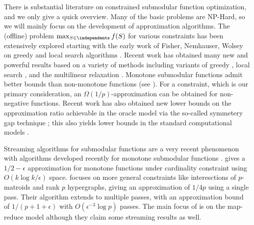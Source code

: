 \documentclass[oneside,letterpaper]{scrartcl} \usepackage{macros}
\newcommand{\eps}{\epsilon}
\begin{document}
There is substantial literature on constrained submodular function
optimization, and we only give a quick overview.  Many of the basic
problems are NP-Hard, so we will mainly focus on the development of
approximation algorithms.  The (offline) problem $\max_{S \in
  \independents} f(S)$ for various constraints has been extensively
explored starting with the early work of Fisher, Nemhauser, Wolsey on
greedy and local search algorithms
\cite{nwf-mssf1-78,fnw-mssf2-78}. Recent work has obtained many new
and powerful results based on a variety of methods including variants
of greedy \cite{grst-10,bfns-smcc-14,bfjs-12}, local search
\cite{LeeMNS10,lsv-smmm-10,FilmusW14}, and the multilinear relaxation
\cite{ccpv-11,KulikST13,BansalKNS12,cvz-mrcrs-11}. Monotone submodular
functions admit better bounds than non-monotone functions (see
).  For a  constraint, which
is our primary consideration, an $\Omega(1/p)$-approximation can be
obtained for non-negative functions. Recent work has also obtained new
lower bounds on the approximation ratio achievable in the oracle model
via the so-called symmetery gap technique \cite{Vondrak13}; this also
yields lower bounds in the standard computational models \cite{dv-12}.

Streaming algorithms for submodular functions are a very recent
phenomenon with algorithms developed recently for monotone submodular
functions \cite{bmkk-sso-14,ck-smms-14}. \cite{bmkk-sso-14} gives a
$1/2-\eps$ approximation for monotone functions under cardinality
constraint using $O(k \log k/\eps)$ space. \cite{ck-smms-14} focuses
on more general constraints like interesctions of $p$-matroids and
rank $p$ hypergraphs, giving an approximation of $1/4p$ using a single
pass. Their algorithm extends to multiple passes, with an
approximation bound of $1/(p+1+\epsilon)$ with $O(\epsilon^{-3} \log
p)$ passes.  The main focus of \cite{kmvv-13} is on the map-reduce
model although they claim some streaming results as well.
\end{document}
